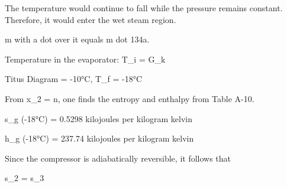 The temperature would continue to fall while the pressure remains constant. Therefore, it would enter the wet steam region.

m with a dot over it equals m dot 134a.

Temperature in the evaporator: T_i = G_k

Titus Diagram = -10°C, T_f = -18°C

From x_2 = n, one finds the entropy and enthalpy from Table A-10.

s_g (-18°C) = 0.5298 kilojoules per kilogram kelvin

h_g (-18°C) = 237.74 kilojoules per kilogram kelvin

Since the compressor is adiabatically reversible, it follows that

s_2 = s_3